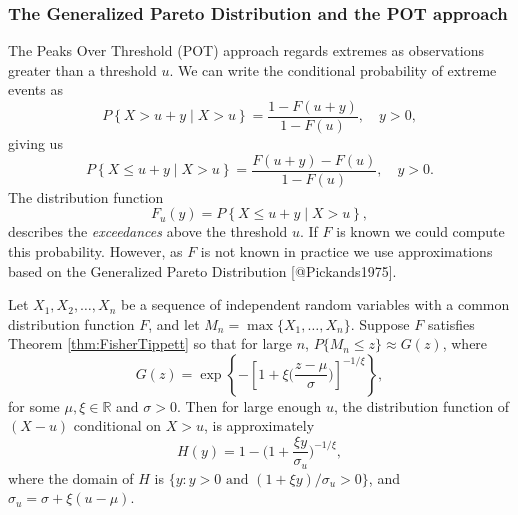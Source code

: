 \documentclass[
]{article}
\begin{document}
\hypertarget{the-generalized-pareto-distribution-and-the-pot-approach}{%
\subsubsection*{The Generalized Pareto Distribution and the POT
approach}\label{the-generalized-pareto-distribution-and-the-pot-approach}}

The Peaks Over Threshold (POT) approach regards extremes as observations
greater than a threshold \(u\). We can write the conditional probability
of extreme events as \begin{equation}\label{eq:POT1}
    P\left \{X > u + y \mid X > u \right \} = \frac{1 - F(u+y)}{1 - F(u)} , \quad y >0  ,
\end{equation} giving us \begin{equation}\label{eq:POT2}
    P\left \{X \leq u + y \mid X > u \right \} = \frac{ F(u+y) - F(u)}{1 - F(u)} , \quad y >0  .
\end{equation} The distribution function \begin{equation}\label{eq:POT3}
    F_u(y) = P\left \{X \leq u + y \mid X > u \right \} ,
\end{equation} describes the \emph{exceedances} above the threshold
\(u\). If \(F\) is known we could compute this probability. However, as
\(F\) is not known in practice we use approximations based on the
Generalized Pareto Distribution {[}@Pickands1975{]}.

\begin{theorem}[Pickands]
  Let $X_1,  X_2, \dots,  X_n$ be a sequence of independent random variables with a common distribution function $F$, and let $M_n = \max \{X_1, \dots, X_n \}$. Suppose $F$ satisfies Theorem \ref{thm:FisherTippett} so that for large $n$, $P\{ M_n \leq z \} \approx G(z)$, where
    $$
    G(z) = \exp\left\{ -\left[ 1 + \xi\Big(\frac{z - \mu}{\sigma} \Big)\right]^{-1/\xi} \right\},
  $$
    for some $\mu, \xi \in \mathbb{R}$ and $\sigma >0$. Then for large enough $u$, the distribution function of $(X-u)$ conditional on $X > u$, is approximately
    \begin{equation}\label{eq:POT4}
        H(y) = 1 - \Big( 1 + \frac{\xi y}{\sigma_u} \Big)^{-1/\xi} ,
    \end{equation}
    where the domain of $H$ is $\{y: y >0 \text{~and~} (1 + \xi y)/\sigma_u >0 \}$, and $\sigma_u = \sigma + \xi(u- \mu)$.
\end{theorem}
\end{document}
